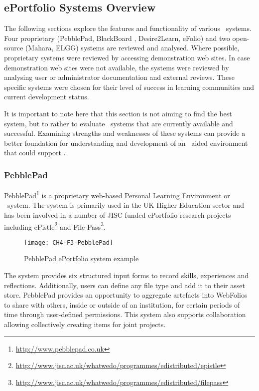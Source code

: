 \subsection{ePortfolio Systems Overview}
The following sections explore the features and functionality of various
\ep~systems. Four proprietary (PebblePad, BlackBoard \ep, Desire2Learn, eFolio)
and two open-source (Mahara, ELGG) systems are reviewed and analysed. Where
possible, proprietary systems were reviewed by accessing demonstration web
sites. In case demonstration web sites were not available, the systems were
reviewed by analysing user or administrator documentation and external reviews.
These specific systems were chosen for their level of success in learning
communities and current development status. 

It is important to note here that this section is not aiming to find the best
system, but to rather to evaluate \ep~systems that are currently available and
successful. Examining strengths and weaknesses of these systems can provide a
better foundation for understanding and development of an \ep~aided environment
that could support \LLLsn.


\subsubsection{PebblePad}

PebblePad\footnote{\url{http://www.pebblepad.co.uk}} is a proprietary web-based
Personal Learning Environment or \ep~system. The system is primarily
used in the UK Higher Education sector and has been involved in a number of JISC
funded ePortfolio research projects including
ePistle\footnote{\url{http://www.jisc.ac.uk/whatwedo/programmes/edistributed/epistle}}
and File-Pass\footnote{\url{http://www.jisc.ac.uk/whatwedo/programmes/edistributed/filepass}}.

\begin{figure}[htb]
\centering
\texttt{[image: CH4-F3-PebblePad]}
\caption[PebblePad ePortfolio system example]{PebblePad ePortfolio system example
\citep{PebbleLearningLtd}}
\label{fig:ppep}
\end{figure}

The system provides six structured input forms to record skills, experiences and
reflections. Additionally, users can define any file type and add it to their
asset store. PebblePad provides an opportunity to aggregate artefacts into
WebFolios to share with others, inside or outside of an institution, for certain
periods of time through user-defined permissions. This system also supports
collaboration allowing collectively creating items for joint projects.

